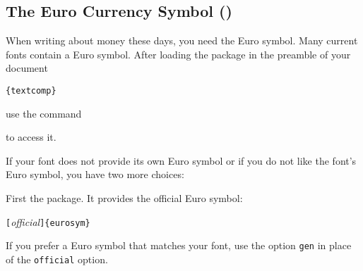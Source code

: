 \subsection{The Euro Currency Symbol \texorpdfstring{(\officialeuro)}{}}

When writing about money these days, you need the Euro symbol. Many current
fonts contain a Euro symbol. After loading the  package in the preamble of your document
\begin{lscommand}
\verb|{textcomp}|
\end{lscommand}
use the command
\begin{lscommand}
\end{lscommand}
to access it.

If your font does not provide its own Euro symbol or if you do not like the
font's Euro symbol, you have two more choices:

First the  package. It provides the official Euro symbol:
\begin{lscommand}
\verb|[|\emph{official}\verb|]{eurosym}|
\end{lscommand}
If you prefer a Euro symbol that matches your font, use the option
\texttt{gen} in place of the \texttt{official} option.



